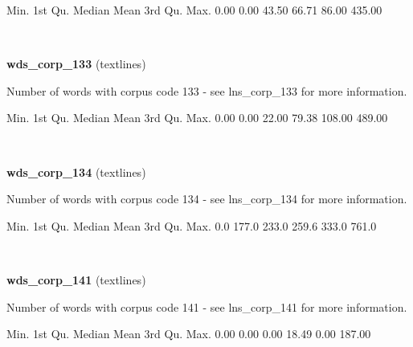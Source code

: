 \documentclass[]{article}
\newenvironment{Shaded}{\begin{snugshade}}{\end{snugshade}}
\newcommand{\FloatTok}[1]{\textcolor[rgb]{0.00,0.00,0.81}{{#1}}}
\newcommand{\NormalTok}[1]{{#1}}
\begin{document}
\begin{Shaded}
\begin{Highlighting}[]
   \NormalTok{Min. 1st Qu.  Median    Mean 3rd Qu.    Max. }
   \FloatTok{0.00}    \FloatTok{0.00}   \FloatTok{43.50}   \FloatTok{66.71}   \FloatTok{86.00}  \FloatTok{435.00} 
\end{Highlighting}
\end{Shaded}

~

\vspace{1em}

\textbf{wds\_corp\_133} (textlines)

Number of words with corpus code 133 - see lns\_corp\_133 for more
information.

\begin{Shaded}
\begin{Highlighting}[]
   \NormalTok{Min. 1st Qu.  Median    Mean 3rd Qu.    Max. }
   \FloatTok{0.00}    \FloatTok{0.00}   \FloatTok{22.00}   \FloatTok{79.38}  \FloatTok{108.00}  \FloatTok{489.00} 
\end{Highlighting}
\end{Shaded}

~

\vspace{1em}

\textbf{wds\_corp\_134} (textlines)

Number of words with corpus code 134 - see lns\_corp\_134 for more
information.

\begin{Shaded}
\begin{Highlighting}[]
   \NormalTok{Min. 1st Qu.  Median    Mean 3rd Qu.    Max. }
    \FloatTok{0.0}   \FloatTok{177.0}   \FloatTok{233.0}   \FloatTok{259.6}   \FloatTok{333.0}   \FloatTok{761.0} 
\end{Highlighting}
\end{Shaded}

~

\vspace{1em}

\textbf{wds\_corp\_141} (textlines)

Number of words with corpus code 141 - see lns\_corp\_141 for more
information.

\begin{Shaded}
\begin{Highlighting}[]
   \NormalTok{Min. 1st Qu.  Median    Mean 3rd Qu.    Max. }
   \FloatTok{0.00}    \FloatTok{0.00}    \FloatTok{0.00}   \FloatTok{18.49}    \FloatTok{0.00}  \FloatTok{187.00} 
\end{Highlighting}
\end{Shaded}
\end{document}
